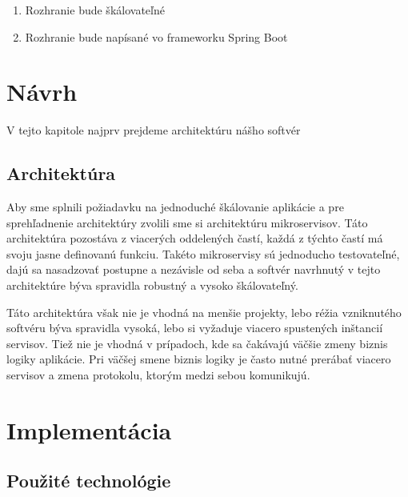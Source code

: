 \begin{enumerate} 

    \item Rozhranie bude škálovateľné 

    \item Rozhranie bude napísané vo frameworku Spring Boot 

\end{enumerate} 

  

\section{Návrh} 

 V tejto kapitole najprv prejdeme architektúru nášho softvér 


  

\subsection{Architektúra} 

 Aby sme splnili požiadavku na jednoduché škálovanie aplikácie a pre sprehľadnenie architektúry zvolili sme si architektúru mikroservisov. Táto architektúra pozostáva z viacerých oddelených častí, každá z týchto častí má svoju jasne definovanú funkciu. Takéto mikroservisy sú jednoducho testovateľné, dajú sa nasadzovať postupne a nezávisle od seba a softvér navrhnutý v tejto architektúre býva spravidla robustný a vysoko škálovateľný.  

  

Táto architektúra však nie je vhodná na menšie projekty, lebo réžia vzniknutého softvéru býva spravidla vysoká, lebo si vyžaduje viacero spustených inštancií servisov. Tiež nie je vhodná v prípadoch, kde sa čakávajú väčšie zmeny biznis logiky aplikácie. Pri väčšej smene biznis logiky je často nutné prerábať viacero servisov a zmena protokolu, ktorým medzi sebou komunikujú. 

  

  

\section{Implementácia} 


  

\subsection{Použité technológie} 

